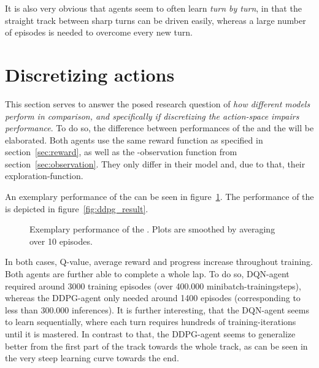 It is also very obvious that agents seem to often learn \textit{turn by turn}, in that the straight track between sharp turns can be driven easily, whereas a large number of episodes is needed to overcome every new turn.

\section{Discretizing actions}

This section serves to answer the posed research question of \textit{how different models perform in comparison, and specifically if discretizing the action-space impairs performance}. To do so, the difference between performances of the  and the  will be elaborated.
Both agents use the same reward function as specified in section~\ref{sec:reward}, as well as the -observation function from section~\ref{sec:observation}. They only differ in their model and, due to that, their exploration-function.

An exemplary performance of the  can be seen in figure~\ref{fig:dqn_result}. The performance of the  is depicted in figure~\ref{fig:ddpg_result}.

\begin{figure}[h!]
	{%
		\setlength{\fboxsep}{0pt}%
		\setlength{\fboxrule}{1pt}%
	}%
	\centering
	\caption[Exemplary performance of the ]{Exemplary performance of the . Plots are smoothed by averaging over 10 episodes.}
	\label{fig:dqn_result}
\end{figure}


In both cases, Q-value, average reward and progress increase throughout training. Both agents are further able to complete a whole lap. To do so, DQN-agent required around 3000 training episodes (over 400.000 minibatch-trainingsteps), whereas the DDPG-agent only needed around 1400 episodes (corresponding to less than 300.000 inferences). It is further interesting, that the DQN-agent seems to learn sequentially, where each turn requires hundreds of training-iterations until it is mastered. In contrast to that, the DDPG-agent seems to generalize better from the first part of the track towards the whole track, as can be seen in the very steep learning curve towards the end.

